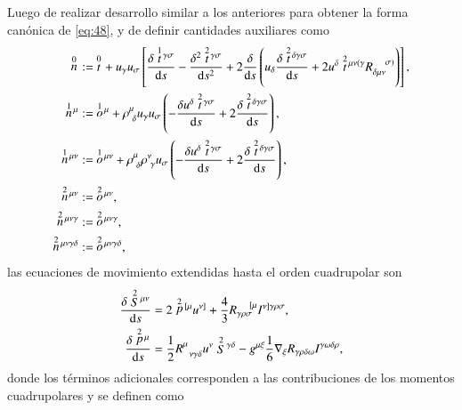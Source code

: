 Luego de realizar desarrollo similar a los anteriores para obtener la forma canónica de \eqref{eq:48}, y de definir cantidades auxiliares como
\begin{align}
\des{0}{n} &:= \ \des{0}{t} + u_{\gamma} u_{\sigma} \left[ \cd{\des{1}{t}^{\gamma \sigma}} - \frac{\delta^2 \des{2}{t}^{\gamma \sigma}}{\mathrm{d}s^2} +2 \cd{} \left( u_{\delta} \cd{\des{2}{t}^{\delta \gamma \sigma}} + 2 u^{\delta} \des{2}{t}^{\mu \nu (\gamma} R_{\delta \mu \nu}^{\ \ \ \ \sigma)} \right) \right],\\
\des{1}{n}^{\mu} &:= \ \des{1}{o}^{\mu} + \rho^{\mu}_{\ \delta} u_{\gamma} u_{\sigma} \left( -\cd{u^{\delta} \des{2}{t}^{\gamma \sigma}} + 2\cd{\des{2}{t}^{\delta \gamma \sigma}} \right),\\
\des{1}{n}^{\mu \nu} &:= \ \des{1}{o}^{\mu \nu} + \rho^{\mu}_{\ \delta} \rho^{\nu}_{\ \gamma} u_{\sigma} \left( -\cd{u^{\delta} \des{2}{t}^{\gamma \sigma}} + 2\cd{\des{2}{t}^{\delta \gamma \sigma}} \right),\\
\des{2}{n}^{\mu \nu} &:= \ \des{2}{o}^{\mu \nu},\\
\des{2}{n}^{\mu \nu \gamma} &:= \ \des{2}{o}^{\mu \nu \gamma},\\
\des{2}{n}^{\mu \nu \gamma \delta} &:= \ \des{2}{o}^{\mu \nu \gamma \delta},
\end{align}
las ecuaciones de movimiento extendidas hasta el orden cuadrupolar son \cite{Steinhoff-Puetzfeld}
\begin{align}
\label{eq:espin-4polo}
\frac{\delta \stackrel{2}{S}{\!}^{\mu \nu}}{\mathrm{d}s} &= 2\stackrel{2}{p}{\!}^{[\mu} u^{\nu]} + \frac{4}{3} R_{\gamma \rho \sigma}^{\ \ \ \ [\mu} I^{\nu] \gamma \rho \sigma},\\
\label{eq:49}
\frac{\delta \stackrel{2}{p}{\!}^{\mu}}{\mathrm{d}s} &= \frac{1}{2} R^{\mu}_{\ \ \nu \gamma \delta} u^{\nu} \stackrel{2}{S}{\!}^{\gamma \delta} - g^{\mu \xi} \frac{1}{6} \nabla_{\xi} R_{\gamma \rho \delta \omega} I^{\gamma \omega \delta \rho},
\end{align}
donde los términos adicionales corresponden a las contribuciones de los momentos cuadrupolares y se definen como
